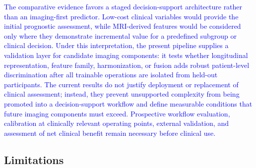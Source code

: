 \documentclass[review]{elsarticle}
\newcommand{\corrigir}[2]{%
	\textcolor{red}{\sout{#1}} %
	\textcolor{blue}{#2}%
}
\begin{document}
	\corrigir{}{The comparative evidence favors a staged decision-support architecture rather than an imaging-first predictor. Low-cost clinical variables would provide the initial prognostic assessment, while MRI-derived features would be considered only where they demonstrate incremental value for a predefined subgroup or clinical decision. Under this interpretation, the present pipeline supplies a validation layer for candidate imaging components: it tests whether longitudinal representation, feature family, harmonization, or fusion adds robust patient-level discrimination after all trainable operations are isolated from held-out participants. The current results do not justify deployment or replacement of clinical assessment; instead, they prevent unsupported complexity from being promoted into a decision-support workflow and define measurable conditions that future imaging components must exceed. Prospective workflow evaluation, calibration at clinically relevant operating points, external validation, and assessment of net clinical benefit remain necessary before clinical use.}
	
	\subsection{Limitations}
	
\end{document}
